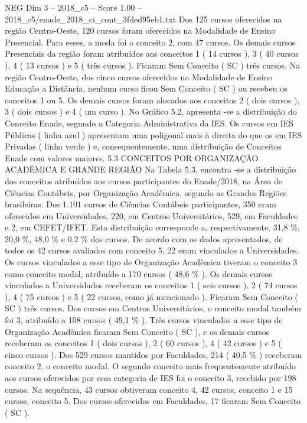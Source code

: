 \begin{textsample}{NEG Dim 3 – 2018\_c5 – Score 1.00 – 2018\_c5/enade\_2018\_ci\_cont\_3fded95eb1.txt}
Dos 125 cursos oferecidos na região Centro-Oeste, 120 cursos foram oferecidos na Modalidade de Ensino Presencial.
Para esses, a moda foi o conceito 2, com 47 cursos.
Os demais cursos Presenciais da região foram atribuídos aos conceitos 1 ( 14 cursos ), 3 ( 40 cursos ), 4 ( 13 cursos ) e 5 ( três cursos ).
Ficaram Sem Conceito ( SC ) três cursos.
Na região Centro-Oeste, dos cinco cursos oferecidos na Modalidade de Ensino Educação a Distância, nenhum curso ficou Sem Conceito ( SC ) ou recebeu os conceitos 1 ou 5.
Os demais cursos foram alocados aos conceitos 2 ( dois cursos ), 3 ( dois cursos ) e 4 ( um curso ).
No Gráfico 5.2, apresenta -se a distribuição do Conceito Enade, segundo a Categoria Administrativa da IES.
Os cursos em IES Públicas ( linha azul ) apresentam uma poligonal mais à direita do que os em IES Privadas ( linha verde ) e, consequentemente, uma distribuição de Conceitos Enade com valores maiores. 5.3 CONCEITOS POR ORGANIZAÇÃO ACADÊMICA E GRANDE REGIÃO Na Tabela 5.3, encontra -se a distribuição dos conceitos atribuídos aos cursos participantes do Enade/2018, na Área de Ciências Contábeis, por Organização Acadêmica, segundo as Grandes Regiões brasileiras.
Dos 1.101 cursos de Ciências Contábeis participantes, 350 eram oferecidos em Universidades, 220, em Centros Universitários, 529, em Faculdades e 2, em CEFET/IFET.
Esta distribuição corresponde a, respectivamente, 31,8 \%, 20,0 \%, 48,0 \% e 0,2 \% dos cursos.
De acordo com os dados apresentados, de todos os 42 cursos avaliados com conceito 5, 22 eram vinculados a Universidades.
Os cursos vinculados a esse tipo de Organização Acadêmica tiveram o conceito 3 como conceito modal, atribuído a 170 cursos ( 48,6 \% ).
Os demais cursos vinculados a Universidades receberam os conceitos 1 ( seis cursos ), 2 ( 74 cursos ), 4 ( 75 cursos ) e 5 ( 22 cursos, como já mencionado ).
Ficaram Sem Conceito ( SC ) três cursos.
Dos cursos em Centros Universitários, o conceito modal também foi 3, atribuído a 108 cursos ( 49,1 \% ).
Três cursos vinculados a esse tipo de Organização Acadêmica ficaram Sem Conceito ( SC ), e os demais cursos receberam os conceitos 1 ( dois cursos ), 2 ( 60 cursos ), 4 ( 42 cursos ) e 5 ( cinco cursos ).
Dos 529 cursos mantidos por Faculdades, 214 ( 40,5 \% ) receberam conceito 2, o conceito modal.
O segundo conceito mais frequentemente atribuído aos cursos oferecidos por essa categoria de IES foi o conceito 3, recebido por 198 cursos.
Na sequência, 43 cursos obtiveram conceito 4, 42 cursos, conceito 1 e 15 cursos, conceito 5.
Dos cursos oferecidos em Faculdades, 17 ficaram Sem Conceito ( SC ).

\end{textsample}
